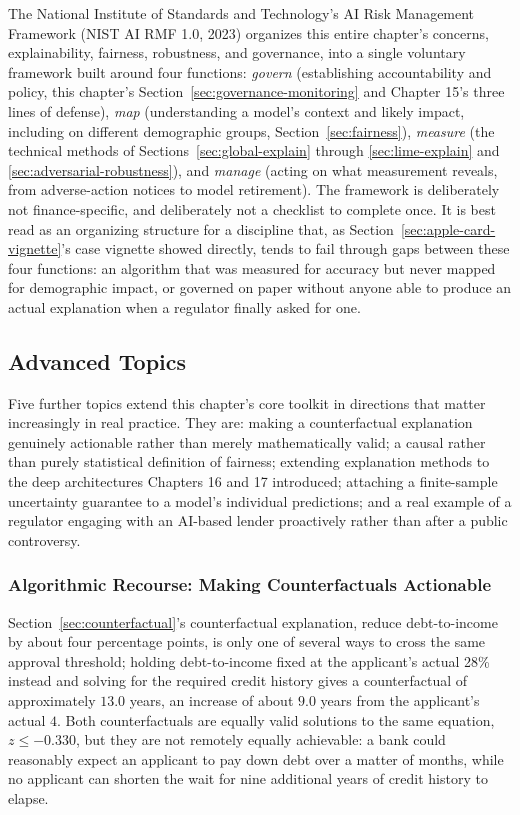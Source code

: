 \documentclass[../ai_in_finance]{subfiles}
\begin{document}
The National Institute of Standards and Technology's AI Risk Management Framework (NIST AI RMF 1.0, 2023) organizes this entire chapter's concerns, explainability, fairness, robustness, and governance, into a single voluntary framework built around four functions: \emph{govern} (establishing accountability and policy, this chapter's Section~\ref{sec:governance-monitoring} and Chapter 15's three lines of defense), \emph{map} (understanding a model's context and likely impact, including on different demographic groups, Section~\ref{sec:fairness}), \emph{measure} (the technical methods of Sections~\ref{sec:global-explain} through \ref{sec:lime-explain} and \ref{sec:adversarial-robustness}), and \emph{manage} (acting on what measurement reveals, from adverse-action notices to model retirement). The framework is deliberately not finance-specific, and deliberately not a checklist to complete once. It is best read as an organizing structure for a discipline that, as Section~\ref{sec:apple-card-vignette}'s case vignette showed directly, tends to fail through gaps between these four functions: an algorithm that was measured for accuracy but never mapped for demographic impact, or governed on paper without anyone able to produce an actual explanation when a regulator finally asked for one.

\subsection{Advanced Topics}
\label{sec:advanced-xai}

Five further topics extend this chapter's core toolkit in directions that matter increasingly in real practice. They are: making a counterfactual explanation genuinely actionable rather than merely mathematically valid; a causal rather than purely statistical definition of fairness; extending explanation methods to the deep architectures Chapters 16 and 17 introduced; attaching a finite-sample uncertainty guarantee to a model's individual predictions; and a real example of a regulator engaging with an AI-based lender proactively rather than after a public controversy.

\subsubsection*{Algorithmic Recourse: Making Counterfactuals Actionable}

Section~\ref{sec:counterfactual}'s counterfactual explanation, reduce debt-to-income by about four percentage points, is only one of several ways to cross the same approval threshold; holding debt-to-income fixed at the applicant's actual 28\% instead and solving for the required credit history gives a counterfactual of approximately $13.0$ years, an increase of about $9.0$ years from the applicant's actual $4$. Both counterfactuals are equally valid solutions to the same equation, $z \le -0.330$, but they are not remotely equally achievable: a bank could reasonably expect an applicant to pay down debt over a matter of months, while no applicant can shorten the wait for nine additional years of credit history to elapse.
\end{document}
